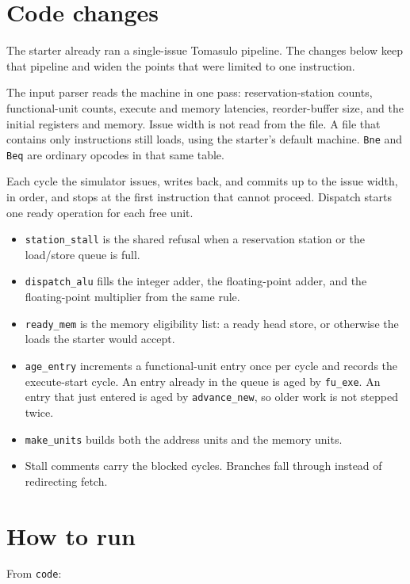 \documentclass[11pt]{article}
\begin{document}
\clearpage
\section{Code changes}

The starter already ran a single-issue Tomasulo pipeline. The changes below keep that pipeline and widen the points that were limited to one instruction.

The input parser reads the machine in one pass: reservation-station counts, functional-unit counts, execute and memory latencies, reorder-buffer size, and the initial registers and memory. Issue width is not read from the file. A file that contains only instructions still loads, using the starter's default machine. \texttt{Bne} and \texttt{Beq} are ordinary opcodes in that same table.

Each cycle the simulator issues, writes back, and commits up to the issue width, in order, and stops at the first instruction that cannot proceed. Dispatch starts one ready operation for each free unit.

\begin{itemize}
\item \texttt{station\_stall} is the shared refusal when a reservation station or the load/store queue is full.
\item \texttt{dispatch\_alu} fills the integer adder, the floating-point adder, and the floating-point multiplier from the same rule.
\item \texttt{ready\_mem} is the memory eligibility list: a ready head store, or otherwise the loads the starter would accept.
\item \texttt{age\_entry} increments a functional-unit entry once per cycle and records the execute-start cycle. An entry already in the queue is aged by \texttt{fu\_exe}. An entry that just entered is aged by \texttt{advance\_new}, so older work is not stepped twice.
\item \texttt{make\_units} builds both the address units and the memory units.
\item Stall comments carry the blocked cycles. Branches fall through instead of redirecting fetch.
\end{itemize}

\clearpage
\section{How to run}

From \texttt{code}:
\end{document}
